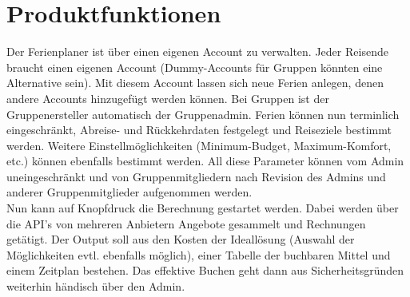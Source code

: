 \documentclass[10pt,a4paper,titlepage,twoside,german,final]{zhawreprt}
\begin{document}
\section{Produktfunktionen}\label{chp:ProductFunctions}
Der Ferienplaner ist über einen eigenen Account zu verwalten. Jeder Reisende braucht einen eigenen Account (Dummy-Accounts für Gruppen könnten eine Alternative sein). Mit diesem Account lassen sich neue Ferien anlegen, denen andere Accounts hinzugefügt werden können. Bei Gruppen ist der Gruppenersteller automatisch der Gruppenadmin. Ferien können nun terminlich eingeschränkt, Abreise- und Rückkehrdaten festgelegt und Reiseziele bestimmt werden. Weitere Einstellmöglichkeiten (Minimum-Budget, Maximum-Komfort, etc.) können ebenfalls bestimmt werden. All diese Parameter können vom Admin uneingeschränkt und von Gruppenmitgliedern nach Revision des Admins und anderer Gruppenmitglieder aufgenommen werden.\\
Nun kann auf Knopfdruck die Berechnung gestartet werden. Dabei werden über die API's von mehreren Anbietern Angebote gesammelt und Rechnungen getätigt. Der Output soll aus den Kosten der Ideallösung (Auswahl der Möglichkeiten evtl. ebenfalls möglich), einer Tabelle der buchbaren Mittel und einem Zeitplan bestehen. Das effektive Buchen geht dann aus Sicherheitsgründen weiterhin händisch über den Admin.
\newpage
\end{document}
